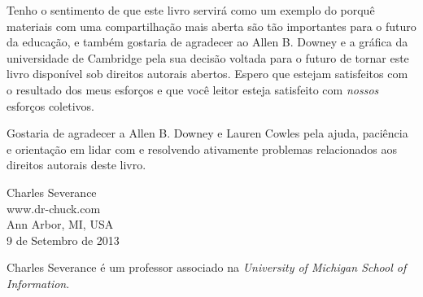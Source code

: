Tenho o sentimento de que este livro servirá como um exemplo do porquê materiais com uma compartilhação mais aberta são tão importantes para o futuro da educação, e também gostaria de agradecer ao Allen B. Downey e a gráfica da universidade de Cambridge pela sua decisão voltada para o futuro de tornar este livro disponível sob direitos autorais abertos. Espero que estejam satisfeitos com o resultado dos meus esforços e que você leitor esteja satisfeito com \emph{nossos} esforços coletivos.

Gostaria de agradecer a Allen B. Downey e Lauren Cowles pela ajuda, paciência e orientação em lidar com e resolvendo ativamente problemas relacionados aos direitos autorais deste livro.

\noindent Charles Severance\\
www.dr-chuck.com\\
Ann Arbor, MI, USA\\
 9 de Setembro de 2013

Charles Severance é um professor associado na  \textit{University of Michigan School of Information}.






\mainmatter

